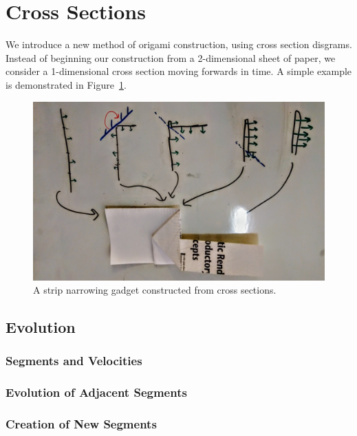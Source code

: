 \section{Cross Sections}
\label{sec:cross_sections}

We introduce a new method of origami construction, using cross section disgrams.
Instead of beginning our construction from a 2-dimensional sheet of paper,
we consider a 1-dimensional cross section moving forwards in time.
A simple example is demonstrated in Figure~\ref{fig:strip_narrowing}.
\begin{figure}[htpb]
    \centering
    \includegraphics[width=0.8\linewidth]{figures/strip_narrowing.jpg}
    \caption{A strip narrowing gadget constructed from cross sections.}
    \label{fig:strip_narrowing}
\end{figure}

\subsection{Evolution}
\label{sec:evolution}

\subsubsection*{Segments and Velocities}
\label{sec:segments_and_velocities}

\subsubsection*{Evolution of Adjacent Segments}
\label{sec:evolution_of_adjacent_segments}

\subsubsection*{Creation of New Segments}
\label{sec:creation_of_new_segments}

